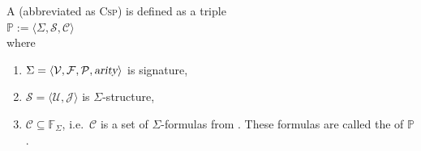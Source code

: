 \begin{Definition}[CSP]  \hspace*{\fill} \linebreak
A   (abbreviated as
\textsc{Csp}) is defined as a triple
\\[0.2cm]
\hspace*{1.3cm}
$\mathbb{P} := \langle \Sigma, \mathcal{S}, \mathcal{C} \rangle$
\\[0.2cm]
where
\begin{enumerate}
\item $\Sigma = \langle \mathcal{V}, \mathcal{F}, \mathcal{P}, \textsl{arity} \rangle$ is signature,
\item $\mathcal{S} = \langle \mathcal{U}, \mathcal{J} \rangle$ is $\Sigma$-structure,
\item $\mathcal{C} \subseteq \mathbb{F}_\Sigma$, i.e.~$\mathcal{C}$ is a set of $\Sigma$-formulas from
      .  These formulas are called the  of $\mathbb{P}$.  \eox
\end{enumerate}
\end{Definition}
\vspace*{-0.3cm}

